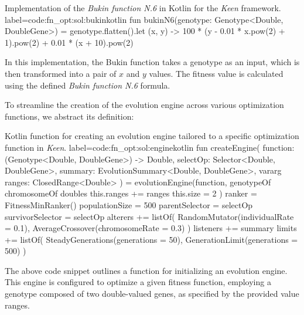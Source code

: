         \begin{code}{
        Implementation of the \textit{Bukin function N.6} in Kotlin for the 
        \textit{Keen} framework.
        }{label=code:fn_opt:sol:bukin}{kotlin}
        fun bukinN6(genotype: Genotype<Double, DoubleGene>) = genotype.flatten().let { (x, y) ->
            100 * (y - 0.01 * x.pow(2) + 1).pow(2) + 0.01 * (x + 10).pow(2)
        }
        \end{code}

        In this implementation, the Bukin function takes a genotype as an input, which is then transformed into a pair 
        of \(x\) and \(y\) values. The fitness value is calculated using the defined \textit{Bukin function N.6} 
        formula.

        To streamline the creation of the evolution engine across various optimization functions, we abstract its 
        definition:

        \begin{code}{
            Kotlin function for creating an evolution engine tailored to a specific optimization function in
            \textit{Keen}.
        }{label=code:fn_opt:sol:engine}{kotlin}
            fun createEngine(
                function: (Genotype<Double, DoubleGene>) -> Double,
                selectOp: Selector<Double, DoubleGene>,
                summary: EvolutionSummary<Double, DoubleGene>,
                vararg ranges: ClosedRange<Double>
            ) = evolutionEngine(function, genotypeOf {
                chromosomeOf {
                    doubles {
                        this.ranges += ranges
                        this.size = 2
                    }
                }
            }) {
                ranker = FitnessMinRanker()
                populationSize = 500
                parentSelector = selectOp
                survivorSelector = selectOp
                alterers += listOf(
                    RandomMutator(individualRate = 0.1), 
                    AverageCrossover(chromosomeRate = 0.3)
                )
                listeners += summary
                limits += listOf(
                    SteadyGenerations(generations = 50), 
                    GenerationLimit(generations = 500)
                )
            }
        \end{code}

        The above code snippet outlines a function for initializing an evolution 
        engine. This engine is configured to optimize a given fitness function, 
        employing a genotype composed of two double-valued genes, as specified by 
        the provided value ranges.

